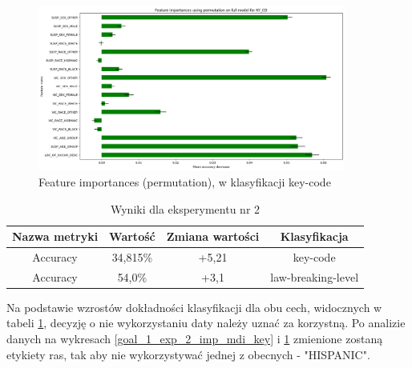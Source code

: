 \documentclass{classrep}
\begin{document}
{{{{                    \begin{figure}[!htbp]
                        \centering
                        \includegraphics[width=0.9\textwidth]{img/5.1.3/2/Feature importances using permutation on full model for KY_CD.png}
                        \caption{Feature importances (permutation), w klasyfikacji key-code}
                        \label{goal_1_exp_2_imp_perm_key}
                    \end{figure}
                    
                    \begin{table}
                    \centering
                     \begin{tabular}{|c|c|c|c|}
                            \hline
                          Nazwa metryki & Wartość & Zmiana wartości & Klasyfikacja \\ \hline
                            Accuracy &  34,815\% & +5,21 & key-code\\ \hline
                            Accuracy &  54,0\% & +3,1 & law-breaking-level\\ \hline
                        \end{tabular}
                        \caption{Wyniki dla eksperymentu nr 2}
                        \label{goal_1_exp_2_results}
                     \end{table}
                     \FloatBarrier

                    Na podstawie wzrostów dokładności klasyfikacji dla obu cech,
                    widocznych w tabeli \ref{goal_1_exp_2_results}, decyzję o nie
                    wykorzystaniu daty należy uznać za korzystną. Po analizie danych na
                    wykresach \ref{goal_1_exp_2_imp_mdi_key} i
                    \ref{goal_1_exp_2_imp_perm_key} zmienione zostaną etykiety ras, tak
                    aby nie wykorzystywać jednej z obecnych - "HISPANIC".
                }

}}}
\end{document}
